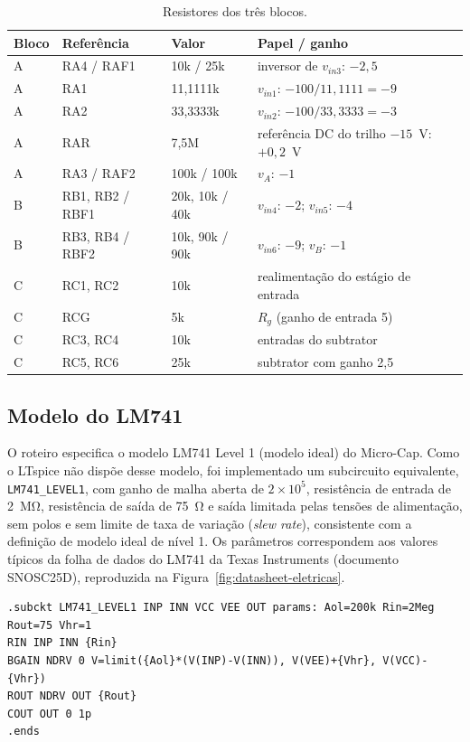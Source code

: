 \begin{table}[htb]
  \centering
  \caption{Resistores dos três blocos.}
  \label{tab:componentes}
  \begin{tabular}{llll}
    \toprule
    Bloco & Referência & Valor & Papel / ganho \\
    \midrule
    A & RA4 / RAF1 & 10k / 25k & inversor de $v_{in3}$: $-2{,}5$ \\
    A & RA1 & 11{,}1111k & $v_{in1}$: $-100/11{,}1111 = -9$ \\
    A & RA2 & 33{,}3333k & $v_{in2}$: $-100/33{,}3333 = -3$ \\
    A & RAR & 7{,}5M & referência DC do trilho $-15$~V: $+0{,}2$~V \\
    A & RA3 / RAF2 & 100k / 100k & $v_A$: $-1$ \\
    \midrule
    B & RB1, RB2 / RBF1 & 20k, 10k / 40k & $v_{in4}$: $-2$; $v_{in5}$: $-4$ \\
    B & RB3, RB4 / RBF2 & 10k, 90k / 90k & $v_{in6}$: $-9$; $v_B$: $-1$ \\
    \midrule
    C & RC1, RC2 & 10k & realimentação do estágio de entrada \\
    C & RCG & 5k & $R_g$ (ganho de entrada 5) \\
    C & RC3, RC4 & 10k & entradas do subtrator \\
    C & RC5, RC6 & 25k & subtrator com ganho 2{,}5 \\
    \bottomrule
  \end{tabular}
\end{table}

\subsection{Modelo do LM741}
\label{sec:modelo}

O roteiro especifica o modelo LM741 Level 1 (modelo ideal) do
Micro-Cap. Como o LTspice não dispõe desse modelo, foi implementado um
subcircuito equivalente, \texttt{LM741\_LEVEL1}, com ganho de malha
aberta de $2\times10^5$, resistência de entrada de \SI{2}{\mega\ohm},
resistência de saída de \SI{75}{\ohm} e saída limitada pelas tensões de
alimentação, sem polos e sem limite de taxa de variação (\emph{slew
rate}), consistente com a definição de modelo ideal de nível 1. Os
parâmetros correspondem aos valores típicos da folha de dados do LM741
da Texas Instruments (documento SNOSC25D), reproduzida na
Figura~\ref{fig:datasheet-eletricas}.

\begin{verbatim}
.subckt LM741_LEVEL1 INP INN VCC VEE OUT params: Aol=200k Rin=2Meg Rout=75 Vhr=1
RIN INP INN {Rin}
BGAIN NDRV 0 V=limit({Aol}*(V(INP)-V(INN)), V(VEE)+{Vhr}, V(VCC)-{Vhr})
ROUT NDRV OUT {Rout}
COUT OUT 0 1p
.ends
\end{verbatim}

